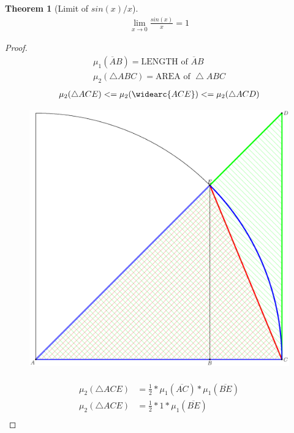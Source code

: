 \documentclass{article}
\newtheorem{theorem}{Theorem}[section]
\theoremstyle{definition}
\begin{document}
\clearpage
\begin{theorem}[Limit of $sin(x)/x$]\label{theorems:limits:sinxoverx}
	\begin{align*}
	\lim_{x \to 0} \frac {sin(x)} {x} = 1
	\end{align*}
\end{theorem}
\begin{proof}	
	\begin{align*}
		\mu_1(\overline AB) = \text{LENGTH of } \overline AB\\
		\mu_2(\bigtriangleup ABC) = \text{AREA of } \bigtriangleup ABC
	\end{align*}
	\begin{align*}
		\mu_2(\bigtriangleup ACE) <= \mu_2( \widearc{ACE}) &<= \mu_2( \bigtriangleup ACD)\\
	\end{align*}
	\begin{figure}[H]
		\centering
		\includegraphics[scale=0.25]{images/limsinxoverx.eps}
	\end{figure}
	\begin{align*}
		\\
		\mu_2(\bigtriangleup ACE) &= \frac{1}{2} * \mu_1(\overline{AC}) * \mu_1(\overline{BE})\\
		\mu_2(\bigtriangleup ACE) &= \frac{1}{2} * 1 * \mu_1(\overline{BE})\\

\end{align*}
\end{proof}
\end{document}
